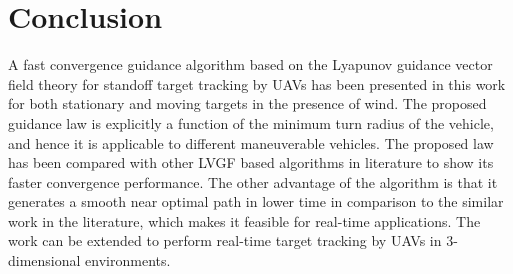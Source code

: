 \documentclass[Afour,sagev,times]{sagej}
\begin{document}
\section{Conclusion}

A fast convergence guidance algorithm based on the Lyapunov guidance vector field theory for standoff target tracking by  UAVs has been presented in this work for both stationary and moving targets in the presence of wind.  The proposed guidance law is explicitly a function of the minimum turn radius of the vehicle, and hence it is applicable to different maneuverable vehicles.  The proposed law has been compared with other LVGF based algorithms in literature  to show its faster convergence performance.  The other advantage of the algorithm is that it generates a smooth near optimal path in lower time in comparison to the similar work in the literature, which makes it feasible for real-time applications. The work can be extended to perform real-time target tracking by  UAVs in  3-dimensional environments. 



\end{document}
